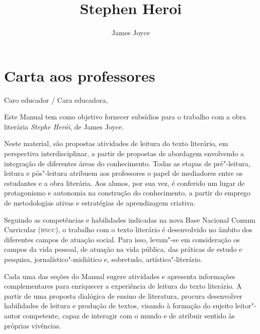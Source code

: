 \documentclass[12pt]{extarticle}
\begin{document}
\newcommand{\AutorLivro}{James Joyce}
\newcommand{\TituloLivro}{Stephen Heroi}
\newcommand{\Tema}{Ficção, mistério e fantasia}
\newcommand{\Genero}{Romance}
\newcommand{\issnppub}{---}
\newcommand{\issnepub}{---}
\newcommand{\colaborador}{\textbf{Alessandra Cabral, Bruno Gradella e Vicente Castro} é uma pessoa incrível e vai fazer um bom serviço.}


\title{\TituloLivro}
\author{\AutorLivro}
\def\authornotes{\colaborador}

\date{}
\maketitle
\tableofcontents

\pagebreak

\section{Carta aos professores}

Caro educador / Cara educadora,\\\bigskip

Este Manual tem como objetivo fornecer subsídios para o trabalho com a
obra literária \emph{Stephe Herói}, de James Joyce.

Neste material, são propostas atividades de leitura do texto literário,
em perspectiva interdisciplinar, a partir de propostas de abordagem
envolvendo a integração de diferentes áreas do conhecimento. Todas as
etapas de pré"-leitura, leitura e pós"-leitura atribuem aos professores o
papel de mediadores entre os estudantes e a obra literária. Aos alunos,
por sua vez, é conferido um lugar de protagonismo e autonomia na
construção do conhecimento, a partir do emprego de metodologias ativas e
estratégias de aprendizagem criativa.

Seguindo as competências e habilidades indicadas na nova Base Nacional
Comum Curricular (\textsc{bncc}), o trabalho com o texto literário é desenvolvido
no âmbito dos diferentes campos de atuação social. Para isso, levam"-se
em consideração os campos da vida pessoal, de atuação na vida pública,
das práticas de estudo e pesquisa, jornalístico"-midiático e, sobretudo,
artístico"-literário.

Cada uma das seções do Manual sugere atividades e apresenta informações
complementares para enriquecer a experiência de leitura do texto
literário. A partir de uma proposta dialógica de ensino de literatura,
procura desenvolver habilidades de leitura e produção de textos, visando
à formação do sujeito leitor"-autor competente, capaz de interagir com o
mundo e de atribuir sentido às próprias vivências.
\end{document}
